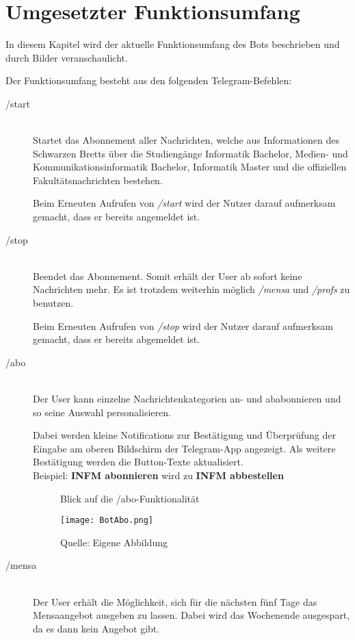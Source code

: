 \chapter{Umgesetzter Funktionsumfang}
In diesem Kapitel wird der aktuelle Funktionsumfang des Bots beschrieben und durch Bilder veranschaulicht.

Der Funktionsumfang besteht aus den folgenden Telegram-Befehlen:

\begin{description}
  \item[/start] \hfill \\
  Startet das Abonnement aller Nachrichten, welche aus Informationen des Schwarzen Bretts über die Studiengänge Informatik Bachelor, Medien- und Kommunikationsinformatik Bachelor, Informatik Master und die offiziellen Fakultätsnachrichten bestehen.

  Beim Erneuten Aufrufen von \emph{/start} wird der Nutzer darauf aufmerksam gemacht, dass er bereits angemeldet ist.
  \item[/stop] \hfill \\
  Beendet das Abonnement. Somit erhält der User ab sofort keine Nachrichten mehr. Es ist trotzdem weiterhin möglich \emph{/mensa} und \emph{/profs} zu benutzen.

  Beim Erneuten Aufrufen von \emph{/stop} wird der Nutzer darauf aufmerksam gemacht, dass er bereits abgemeldet ist.
  \newpage
  \item[/abo] \hfill \\
  Der User kann einzelne Nachrichtenkategorien an- und ababonnieren und so seine Auswahl personalisieren.

  Dabei werden kleine Notifications zur Bestätigung und Überprüfung der Eingabe am oberen Bildschirm der Telegram-App angezeigt. Als weitere Bestätigung werden die Button-Texte aktualisiert. \\
  Beispiel: \textbf{INFM abonnieren} wird zu \textbf{INFM abbestellen}

  \begin{figure}[!htb]
      \centering
      \caption{Blick auf die /abo-Funktionalität}
        \texttt{[image: BotAbo.png]}
      \caption*{Quelle: Eigene Abbildung}
  \end{figure}

  \item[/mensa] \hfill \\
  Der User erhält die Möglichkeit, sich für die nächsten fünf Tage das Mensaangebot ausgeben zu lassen. Dabei wird das Wochenende ausgespart, da es dann kein Angebot gibt.


\end{description}
